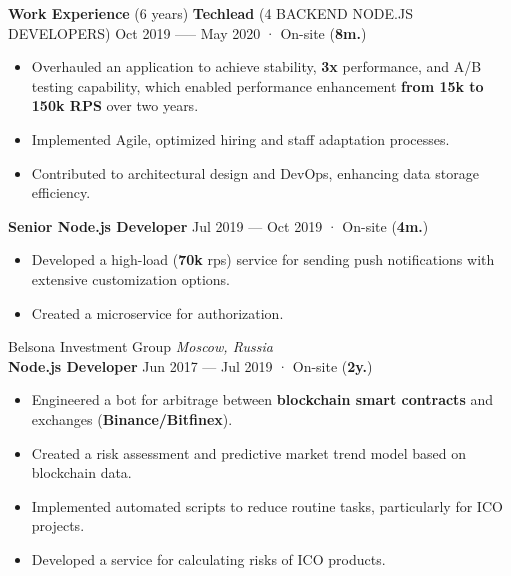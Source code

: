 \documentclass{resume}
\begin{document}
\begin{rSection}{\textbf{Work Experience} (6 years) }
\textbf{Techlead} (4 BACKEND NODE.JS DEVELOPERS) \hfill Oct 2019 —-- May 2020 · On-site ({\textbf{8m.}})
\begin{itemize}
    \item Overhauled an application to achieve stability, \textbf{3x} performance, and A/B testing capability,
    which enabled performance enhancement \textbf{from 15k to 150k RPS} over two years\@.
    \item Implemented Agile, optimized hiring and staff adaptation processes\@.
    \item Contributed to architectural design and DevOps, enhancing data storage efficiency\@.
\end{itemize}

\textbf{Senior Node.js Developer} \hfill Jul 2019 --- Oct 2019 · On-site ({\textbf{4m.}})
\begin{itemize}
    \item Developed a high-load (\textbf{70k} rps) service for sending push notifications with extensive customization options\@.
    \item Created a microservice for authorization\@.
\end{itemize}

Belsona Investment Group \hfill \textit{Moscow, Russia} \\
\textbf{Node.js Developer}  \hfill Jun 2017 --- Jul 2019 · On-site ({\textbf{2y.}})

\begin{itemize}
    \item Engineered a bot for arbitrage between \textbf{blockchain smart contracts} and exchanges (\textbf{Binance/Bitfinex})\@.
    \item Created a risk assessment and predictive market trend model based on blockchain data\@.
    \item Implemented automated scripts to reduce routine tasks, particularly for ICO projects\@.
    \item Developed a service for calculating risks of ICO products\@.
\end{itemize}

\end{rSection}
\end{document}
